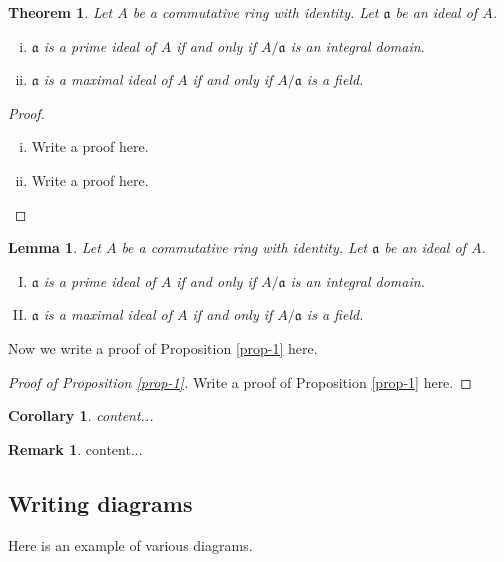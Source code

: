 \documentclass[11pt,leqno]{amsart}
\numberwithin{equation}{subsection}
\newtheorem{theorem}[equation]{Theorem}
\newtheorem{corollary}[equation]{Corollary}
\newtheorem{lemma}[equation]{Lemma}
\theoremstyle{definition}
\newtheorem{remark}[equation]{Remark}
\begin{document}
\begin{theorem}
	Let $A$ be a commutative ring with identity. Let $\mathfrak a$ be an ideal of $A$. 
	\begin{enumerate}[(i)]
		\item $\mathfrak a$ is a prime ideal of $A$ if and only if $A/\mathfrak a$ is an integral domain. 
		\item $\mathfrak a$ is a maximal ideal of $A$ if and only if $A/\mathfrak a$ is a field. 
	\end{enumerate}
\end{theorem}

\begin{proof}
	\begin{enumerate}[(i)]
		\item Write a proof here. 
		
		\item Write a proof here. 
	\end{enumerate}
\end{proof}

\begin{lemma}
	Let $A$ be a commutative ring with identity. Let $\mathfrak a$ be an ideal of $A$. 
	\begin{enumerate}[(I)]
		\item $\mathfrak a$ is a prime ideal of $A$ if and only if $A/\mathfrak a$ is an integral domain. 
		\item $\mathfrak a$ is a maximal ideal of $A$ if and only if $A/\mathfrak a$ is a field. 
	\end{enumerate}
\end{lemma}

Now we write a proof of Proposition \ref{prop-1} here. 
\begin{proof}[Proof of Proposition \ref{prop-1}]
	Write a proof of Proposition \ref{prop-1} here. 
\end{proof}

\begin{corollary}
	content...
\end{corollary}

\begin{remark}
	content...
\end{remark}


\subsection{Writing diagrams}
Here is an example of various diagrams. 
\end{document}
